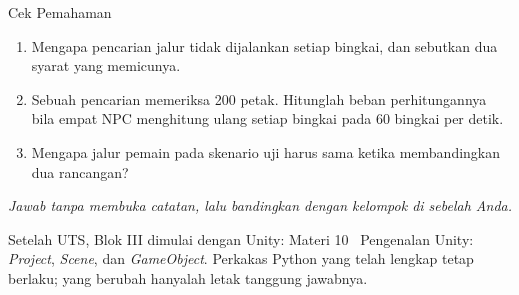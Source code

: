 \documentclass[aspectratio=169,10pt]{beamer}
\begin{document}
\begin{frame}{Cek Pemahaman}
\begin{enumerate}
  \item Mengapa pencarian jalur tidak dijalankan setiap bingkai, dan sebutkan
        dua syarat yang memicunya.
  \item Sebuah pencarian memeriksa 200 petak. Hitunglah beban perhitungannya
        bila empat NPC menghitung ulang setiap bingkai pada 60 bingkai per
        detik.
  \item Mengapa jalur pemain pada skenario uji harus sama ketika membandingkan
        dua rancangan?
\end{enumerate}
\vspace{0.35cm}
{\footnotesize\color{ubMuted}\itshape Jawab tanpa membuka catatan, lalu
bandingkan dengan kelompok di sebelah Anda.}
\end{frame}

  {Setelah UTS, Blok III dimulai dengan Unity: Materi 10 \textperiodcentered\
   Pengenalan Unity: \emph{Project}, \emph{Scene}, dan \emph{GameObject}.
   Perkakas Python yang telah lengkap tetap berlaku; yang berubah hanyalah
   letak tanggung jawabnya.}
\end{document}
